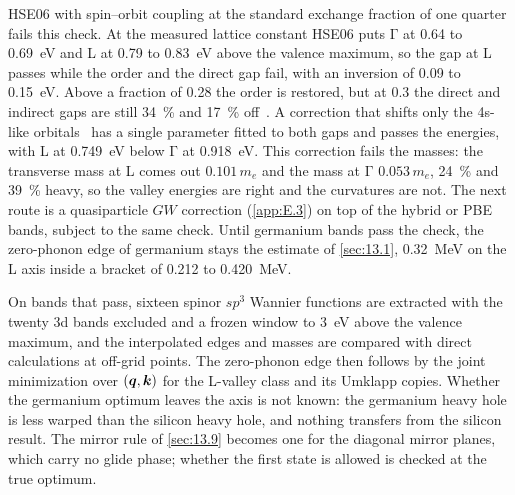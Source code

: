 HSE06 with spin--orbit coupling at the standard exchange fraction of one quarter fails this check. At the measured lattice constant HSE06 puts $\mathrm{\Gamma}$ at 0.64 to \SI{0.69}{eV} and L at 0.79 to \SI{0.83}{eV} above the valence maximum, so the gap at L passes while the order and the direct gap fail, with an inversion of 0.09 to \SI{0.15}{eV}. Above a fraction of 0.28 the order is restored, but at 0.3 the direct and indirect gaps are still \SI{34}{\percent} and \SI{17}{\percent} off~\cite[Fig.~1(a)]{abdurrazaq2025accurate}. A correction that shifts only the 4s-like orbitals~\cite{abdurrazaq2025accurate} has a single parameter fitted to both gaps and passes the energies, with L at \SI{0.749}{eV} below $\mathrm{\Gamma}$ at \SI{0.918}{eV}. This correction fails the masses: the transverse mass at L comes out $0.101\,m_e$ and the mass at $\mathrm{\Gamma}$ $0.053\,m_e$, \SI{24}{\percent} and \SI{39}{\percent} heavy, so the valley energies are right and the curvatures are not. The next route is a quasiparticle $GW$ correction (\cref{app:E.3}) on top of the hybrid or PBE bands, subject to the same check. Until germanium bands pass the check, the zero-phonon edge of germanium stays the estimate of \cref{sec:13.1}, \SI{0.32}{MeV} on the L axis inside a bracket of 0.212 to \SI{0.420}{MeV}.

On bands that pass, sixteen spinor $sp^3$ Wannier functions are extracted with the twenty 3d bands excluded and a frozen window to \SI{3}{eV} above the valence maximum, and the interpolated edges and masses are compared with direct calculations at off-grid points. The zero-phonon edge then follows by the joint minimization over $(\bm{q},\bm{k})$ for the L-valley class and its Umklapp copies. Whether the germanium optimum leaves the axis is not known: the germanium heavy hole is less warped than the silicon heavy hole, and nothing transfers from the silicon result. The mirror rule of \cref{sec:13.9} becomes one for the diagonal mirror planes, which carry no glide phase; whether the first state is allowed is checked at the true optimum.

